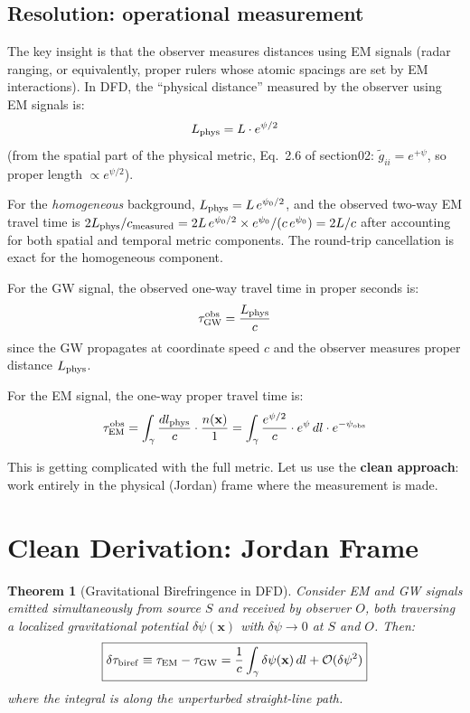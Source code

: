 \documentclass[11pt]{article}
\newtheorem{theorem}{Theorem}
\begin{document}
\subsection{Resolution: operational measurement}

The key insight is that the observer measures distances using EM
signals (radar ranging, or equivalently, proper rulers whose atomic
spacings are set by EM interactions). In DFD, the ``physical
distance'' measured by the observer using EM signals is:
\begin{equation}
L_{\rm phys} = L \cdot e^{\psi/2}
\end{equation}
(from the spatial part of the physical metric, Eq.~2.6 of section02:
$\tilde{g}_{ii} = e^{+\psi}$, so proper length $\propto e^{\psi/2}$).

For the \emph{homogeneous} background, $L_{\rm phys} = L\,e^{\psi_0/2}$,
and the observed two-way EM travel time is $2L_{\rm phys}/c_{\rm measured}
= 2L\,e^{\psi_0/2} \times e^{\psi_0}/(c\,e^{\psi_0}) = 2L/c$ after
accounting for both spatial and temporal metric components. The round-trip
cancellation is exact for the homogeneous component.

For the GW signal, the observed one-way travel time in proper seconds is:
\begin{equation}
\tau_{\rm GW}^{\rm obs} = \frac{L_{\rm phys}}{c}
\end{equation}
since the GW propagates at coordinate speed $c$ and the observer
measures proper distance $L_{\rm phys}$.

For the EM signal, the one-way proper travel time is:
\begin{equation}
\tau_{\rm EM}^{\rm obs} = \int_\gamma \frac{dl_{\rm phys}}{c}
\cdot \frac{n(\mathbf{x})}{1} = \int_\gamma \frac{e^{\psi/2}}{c}
\cdot e^{\psi}\,dl \cdot e^{-\psi_{\rm obs}}
\end{equation}

This is getting complicated with the full metric. Let us use the
\textbf{clean approach}: work entirely in the physical (Jordan) frame
where the measurement is made.

\section{Clean Derivation: Jordan Frame}

\begin{theorem}[Gravitational Birefringence in DFD]\label{thm:biref}
Consider EM and GW signals emitted simultaneously from source $S$
and received by observer $O$, both traversing a localized
gravitational potential $\delta\psi(\mathbf{x})$ with
$\delta\psi \to 0$ at $S$ and $O$. Then:
\begin{equation}
\boxed{
\delta\tau_{\rm biref} \equiv \tau_{\rm EM} - \tau_{\rm GW}
= \frac{1}{c}\int_\gamma \delta\psi(\mathbf{x})\,dl
+ \mathcal{O}(\delta\psi^2)
}
\end{equation}
where the integral is along the unperturbed straight-line path.
\end{theorem}
\end{document}

